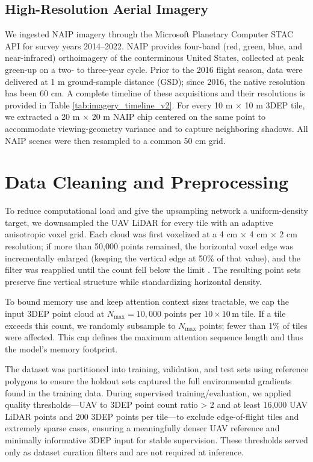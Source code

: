 \documentclass[12pt]{report}
\begin{document}
\subsection{High-Resolution Aerial Imagery}
We ingested NAIP imagery through the Microsoft Planetary Computer STAC API \citep{planetary_computer} for survey years 2014–2022. NAIP provides four-band (red, green, blue, and near-infrared) orthoimagery of the conterminous United States, collected at peak green-up on a two- to three-year cycle. Prior to the 2016 flight season, data were delivered at 1 m ground-sample distance (GSD); since 2016, the native resolution has been 60 cm. A complete timeline of these acquisitions and their resolutions is provided in Table \ref{tab:imagery_timeline_v2}. For every 10 m × 10 m 3DEP tile, we extracted a 20 m × 20 m NAIP chip centered on the same point to accommodate viewing-geometry variance and to capture neighboring shadows. All NAIP scenes were then resampled to a common 50 cm grid.



\section{Data Cleaning and Preprocessing}
To reduce computational load and give the upsampling network a uniform-density target, we downsampled the UAV LiDAR for every tile with an adaptive anisotropic voxel grid. Each cloud was first voxelized at a 4 cm × 4 cm × 2 cm resolution; if more than 50,000 points remained, the horizontal voxel edge was incrementally enlarged (keeping the vertical edge at 50\% of that value), and the filter was reapplied until the count fell below the limit
. The resulting point sets preserve fine vertical structure while standardizing horizontal density.

To bound memory use and keep attention context sizes tractable, we cap the input 3DEP point cloud at $N_{\max}=10{,}000$ points per $10\times10$\,m tile. If a tile exceeds this count, we randomly subsample to $N_{\max}$ points; fewer than 1\% of tiles were affected. This cap defines the maximum attention sequence length and thus the model's memory footprint.

The dataset was partitioned into training, validation, and test sets using reference polygons to ensure the holdout sets captured the full environmental gradients found in the training data. During supervised training/evaluation, we applied quality thresholds—UAV to 3DEP point count ratio > 2 and at least 16,000 UAV LiDAR points and 200 3DEP points per tile—to exclude edge-of-flight tiles and extremely sparse cases, ensuring a meaningfully denser UAV reference and minimally informative 3DEP input for stable supervision. These thresholds served only as dataset curation filters and are not required at inference.
\end{document}

